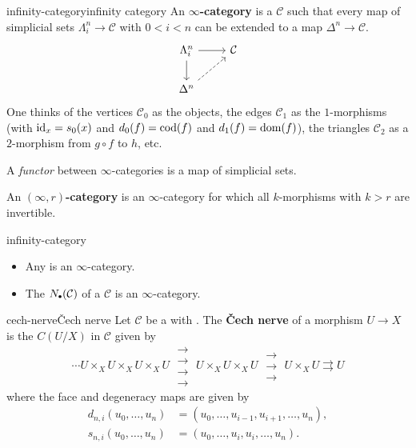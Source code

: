 \begin{topic}{infinity-category}{infinity category}
    An \textbf{$\infty$-category} is a  $\mathcal{C}$ such that every map of simplicial sets $\Lambda^n_i \to \mathcal{C}$ with $0 < i < n$ can be extended to a map $\Delta^n \to \mathcal{C}$.
    \[ \svg \begin{tikzcd} \Lambda^n_i \arrow{r} \arrow{d} & \mathcal{C} \\ \Delta^n \arrow[dashed]{ur} & \end{tikzcd} \]
    One thinks of the vertices $\mathcal{C}_0$ as the objects, the edges $\mathcal{C}_1$ as the $1$-morphisms (with $\textup{id}_x = s_0(x)$ and $d_0(f) = \textup{cod}(f)$ and $d_1(f) = \textup{dom}(f)$), the triangles $\mathcal{C}_2$ as a $2$-morphism from $g \circ f$ to $h$, etc.
    
    A \textit{functor} between $\infty$-categories is a map of simplicial sets.
    
    An \textbf{$(\infty, r)$-category} is an $\infty$-category for which all $k$-morphisms with $k > r$ are invertible.
\end{topic}

\begin{example}{infinity-category}
    \begin{itemize}
        \item Any  is an $\infty$-category.
        \item The  $N_\bdot(\mathcal{C})$ of a  $\mathcal{C}$ is an $\infty$-category.
    \end{itemize}
\end{example}

\begin{topic}{cech-nerve}{Čech nerve}
    Let $\mathcal{C}$ be a  with . The \textbf{Čech nerve} of a morphism $U \to X$ is the  $C(U/X)$ in $\mathcal{C}$ given by
    \[ \cdots U \times_X U \times_X U \times_X U \; \substack{\rightarrow \\[-0.9em] \rightarrow \\[-0.9em] \rightarrow \\[-0.9em] \rightarrow} \; U \times_X U \times_X U \; \substack{\rightarrow \\[-0.9em] \rightarrow \\[-0.9em] \rightarrow} \; U \times_X U \rightrightarrows U \]
    where the face and degeneracy maps are given by
    \[ \begin{aligned}
        d_{n, i}(u_0, \ldots, u_n) &= (u_0, \ldots, u_{i - 1}, u_{i + 1}, \ldots, u_n), \\
        s_{n, i}(u_0, \ldots, u_n) &= (u_0, \ldots, u_i, u_i, \ldots, u_n) .
    \end{aligned} \]
\end{topic}

